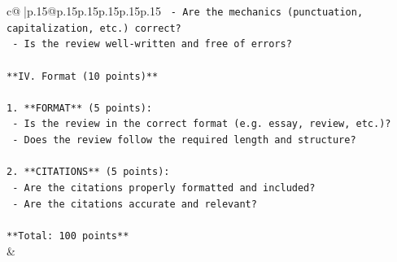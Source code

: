 \documentclass{article}
\begin{document}
{\begin{supertabular}{c@{$\;$}|p{.15\linewidth}@{}p{.15\linewidth}p{.15\linewidth}p{.15\linewidth}p{.15\linewidth}p{.15\linewidth}}
{{{\texttt{   {-} Are the mechanics (punctuation, capitalization, etc.) correct?} \\
\texttt{   {-} Is the review well{-}written and free of errors?} \\
\\ 
\texttt{**IV. Format (10 points)**} \\
\\ 
\texttt{1. **FORMAT** (5 points):} \\
\texttt{   {-} Is the review in the correct format (e.g. essay, review, etc.)?} \\
\texttt{   {-} Does the review follow the required length and structure?} \\
\\ 
\texttt{2. **CITATIONS** (5 points):} \\
\texttt{   {-} Are the citations properly formatted and included?} \\
\texttt{   {-} Are the citations accurate and relevant?} \\
\\ 
\texttt{**Total: 100 points**} \\
            }
        }
    }
    & \\ \\


\end{supertabular}}
\end{document}

